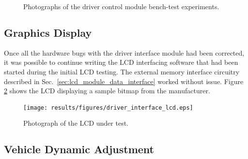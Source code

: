 \begin{figure}[h!]
\centering
{}
\caption{Photographs of the driver control module bench-test experiments.}
\label{fig:bench_experiments}
\end{figure}

\subsection{Graphics Display}

Once all the hardware bugs with the driver interface module had been corrected, it was possible to continue writing the LCD interfacing software that had been started during the initial LCD testing. The external memory interface circuitry described in Sec.\ \ref{sec:lcd_module_data_interface} worked without issue. Figure \ref{fig:driver_interface_lcd} shows the LCD displaying a sample bitmap from the manufacturer.

\begin{figure}[H]
 \centering
 \texttt{[image: results/figures/driver\_interface\_lcd.eps]}
 \caption{Photograph of the LCD under test.}
 \label{fig:driver_interface_lcd}
\end{figure}

\subsection{Vehicle Dynamic Adjustment}

